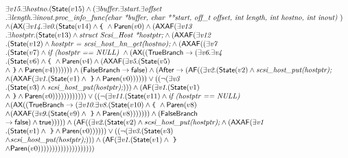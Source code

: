 \documentclass{article}
\newcommand{\AX}{\mbox{\sf{AX}}}
\newcommand{\AF}{\mbox{\sf{AF}}}
\newcommand{\mita}[1]{\mbox{\it{{#1}}}}
\newcommand{\msf}[1]{\mbox{\sf{{#1}}}}
\newcommand{\ttlb}{\mbox{\tt \char'173}}
\newcommand{\ttrb}{\mbox{\tt \char'175}}
\begin{document}
\[\begin{array}{l}
\exists \mita{v15} . \exists \mita{hostno} . (\msf{State}(v15) \wedge (\exists \mita{buffer} . \exists \mita{start} . \exists \mita{offset}\\ . \exists \mita{length} . \exists \mita{inout} . \mita{proc\_info\_func(char *buffer, char **start, off\_t offset, int length,
               int hostno, int inout) })\\ \wedge (\AX(\exists \mita{v14} . \exists \mita{v0} . (\msf{State}(v14) \wedge \mita{{\ttlb}
  } \wedge \msf{Paren}(v0) \wedge (\AX\AF(\exists \mita{v13}\\ . \exists \mita{hostptr} . (\msf{State}(v13) \wedge \mita{struct Scsi\_Host *hostptr;} \wedge (\AX\AF(\exists \mita{v12}\\ . (\msf{State}(v12) \wedge \mita{hostptr = scsi\_host\_hn\_get(hostno);} \wedge (\AX\AF((\exists \mita{v7}\\ . (\msf{State}(v7) \wedge \mita{if (hostptr == NULL) } \wedge (\AX((\msf{TrueBranch} \rightarrow (\exists \mita{v6} . \exists \mita{v4}\\ . (\msf{State}(v6) \wedge \mita{{\ttlb}
  } \wedge \msf{Paren}(v4) \wedge (\AX\AF(\exists \mita{v5} . (\msf{State}(v5)\\ \wedge \mita{
{\ttrb}} \wedge \msf{Paren}(v4))))))) \wedge (\msf{FalseBranch} \rightarrow \msf{false}) \wedge (\msf{After} \rightarrow (\AF((\exists \mita{v2} . (\msf{State}(v2) \wedge \mita{scsi\_host\_put(hostptr);}\\ \wedge (\AX\AF(\exists \mita{v1} . (\msf{State}(v1) \wedge \mita{
{\ttrb}} \wedge \msf{Paren}(v0)))))) \vee ((\neg (\exists \mita{v3}\\ . (\msf{State}(v3) \wedge \mita{scsi\_host\_put(hostptr);}))) \wedge (\AF(\exists \mita{v1} . (\msf{State}(v1)\\ \wedge \mita{
{\ttrb}} \wedge \msf{Paren}(v0)))))))))))) \vee ((\neg (\exists \mita{v11} . (\msf{State}(v11) \wedge \mita{if (hostptr == NULL) }\\ \wedge (\AX((\msf{TrueBranch} \rightarrow (\exists \mita{v10} . \exists \mita{v8} . (\msf{State}(v10) \wedge \mita{{\ttlb}
  } \wedge \msf{Paren}(v8)\\ \wedge (\AX\AF(\exists \mita{v9} . (\msf{State}(v9) \wedge \mita{
{\ttrb}} \wedge \msf{Paren}(v8))))))) \wedge (\msf{FalseBranch}\\ \rightarrow \msf{false}) \wedge \msf{true}))))) \wedge (\AF((\exists \mita{v2} . (\msf{State}(v2) \wedge \mita{scsi\_host\_put(hostptr);} \wedge (\AX\AF(\exists \mita{v1}\\ . (\msf{State}(v1) \wedge \mita{
{\ttrb}} \wedge \msf{Paren}(v0)))))) \vee ((\neg (\exists \mita{v3} . (\msf{State}(v3)\\ \wedge \mita{scsi\_host\_put(hostptr);}))) \wedge (\AF(\exists \mita{v1} . (\msf{State}(v1) \wedge \mita{
{\ttrb}}\\ \wedge \msf{Paren}(v0))))))))))))))))))))
\end{array}\]
\end{document}
